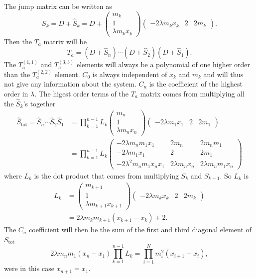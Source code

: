 \documentclass[english,master]{liumaiex}
\theoremstyle{plain}
\theoremstyle{definition}
\begin{document}
The jump matrix can be written as
\begin{equation}
	S_k = D + \hat{S}_k = D + 
	\begin{pmatrix}
		m_k \\ 1 \\ \lambda m_k x_k		
	\end{pmatrix}
	\begin{pmatrix}
		-2 \lambda m_k x_k & 2 & 2 m_k
	\end{pmatrix}.
\end{equation}
Then the $T_a$ matrix will be
\begin{equation}
	T_a = (D + \hat{S}_n)\cdots(D + \hat{S}_2)(D + \hat{S}_1).
\end{equation}
The $T_a^{(1,1)}$ and $T_a^{(3,3)}$ elements will always be a polynomial of one higher order than the $T_a^{(2,2)}$ element. $C_0$ is always independent of $x_k$ and $m_k$ and will thus not give any information about the system. $C_n$ is the coefficient of the highest order in $\lambda$. The higest order terms of the $T_a$ matrix comes from multiplying all the $\hat{S}_k$'s together
\begin{equation}
\begin{aligned}
	\hat{S}_{\text{tot}} = \hat{S}_n \cdots \hat{S}_2 \hat{S}_1 &=
	\prod_{k=1}^{n-1} L_k
	\begin{pmatrix}
		m_n \\ 1 \\ \lambda m_n x_n
	\end{pmatrix}
	\begin{pmatrix}
		-2\lambda m_1x_1 & 2 & 2 m_1
	\end{pmatrix} \\
	&= \prod_{k=1}^{n-1} L_k
	\begin{pmatrix}
		-2\lambda m_n m_1 x_1 & 2m_n & 2m_n m_1 \\
		-2\lambda m_1 x_1 & 2 & 2m_1 \\
		-2\lambda^2 m_n m_1 x_n x_1 & 2\lambda m_n x_n & 2\lambda m_n m_1 x_n
	\end{pmatrix}
\end{aligned}
\end{equation}
where $L_k$ is the dot product that comes from multiplying $S_k$ and $S_{k+1}$. So $L_k$ is
\begin{equation}
\begin{aligned}
	L_k &= 
	\begin{pmatrix}
		m_{k+1} \\ 1 \\ \lambda m_{k+1} x_{k+1}
	\end{pmatrix}
	\begin{pmatrix}
		-2\lambda m_kx_k & 2 & 2 m_k
	\end{pmatrix} \\
	&= 2\lambda m_k m_{k+1} (x_{k+1} - x_k) + 2.
\end{aligned}
\end{equation}
The $C_n$ coefficient will then be the sum of the first and third diagonal element of $S_{\text{tot}}$
\begin{equation}
	2\lambda m_n m_1 (x_n - x_1) \prod_{k=1}^{n-1} L_k
	= \prod_{i=1}^{N} m_i^2 (x_{i+1} - x_i),
\end{equation}
were in this case $x_{n+1} = x_1$.
\end{document}
